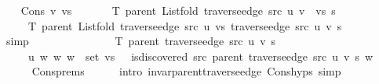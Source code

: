 \begin{isabellebody}
\isanewline
\ \ \isamarkupfalse%
\ {\isacharparenleft}{\kern0pt}Cons\ v\ vs{\isacharparenright}{\kern0pt}\isanewline
\ \ \isamarkupfalse%
\isanewline
\ \ \ \ {\isachardoublequoteopen}T\ {\isacharparenleft}{\kern0pt}parent\ {\isacharparenleft}{\kern0pt}List{\isachardot}{\kern0pt}fold\ {\isacharparenleft}{\kern0pt}traverse{\isacharunderscore}{\kern0pt}edge\ src\ u{\isacharparenright}{\kern0pt}\ {\isacharparenleft}{\kern0pt}v\ {\isacharhash}{\kern0pt}\ vs{\isacharparenright}{\kern0pt}\ s{\isacharparenright}{\kern0pt}{\isacharparenright}{\kern0pt}\ {\isacharequal}{\kern0pt}\isanewline
\ \ \ \ \ T\ {\isacharparenleft}{\kern0pt}parent\ {\isacharparenleft}{\kern0pt}List{\isachardot}{\kern0pt}fold\ {\isacharparenleft}{\kern0pt}traverse{\isacharunderscore}{\kern0pt}edge\ src\ u{\isacharparenright}{\kern0pt}\ vs\ {\isacharparenleft}{\kern0pt}traverse{\isacharunderscore}{\kern0pt}edge\ src\ u\ v\ s{\isacharparenright}{\kern0pt}{\isacharparenright}{\kern0pt}{\isacharparenright}{\kern0pt}{\isachardoublequoteclose}\isanewline
\ \ \ \ \isamarkupfalse%
\ simp\isanewline
\ \ \isamarkupfalse%
\ \isamarkupfalse%
\isanewline
\ \ \ \ {\isachardoublequoteopen}{\isachardot}{\kern0pt}{\isachardot}{\kern0pt}{\isachardot}{\kern0pt}\ {\isacharequal}{\kern0pt}\isanewline
\ \ \ \ \ T\ {\isacharparenleft}{\kern0pt}parent\ {\isacharparenleft}{\kern0pt}traverse{\isacharunderscore}{\kern0pt}edge\ src\ u\ v\ s{\isacharparenright}{\kern0pt}{\isacharparenright}{\kern0pt}\ {\isasymunion}\isanewline
\ \ \ \ \ {\isacharbraceleft}{\kern0pt}{\isacharparenleft}{\kern0pt}u{\isacharcomma}{\kern0pt}\ w{\isacharparenright}{\kern0pt}\ {\isacharbar}{\kern0pt}w{\isachardot}{\kern0pt}\ w\ {\isasymin}\ set\ vs\ {\isasymand}\ {\isasymnot}\ is{\isacharunderscore}{\kern0pt}discovered\ src\ {\isacharparenleft}{\kern0pt}parent\ {\isacharparenleft}{\kern0pt}traverse{\isacharunderscore}{\kern0pt}edge\ src\ u\ v\ s{\isacharparenright}{\kern0pt}{\isacharparenright}{\kern0pt}\ w{\isacharbraceright}{\kern0pt}{\isachardoublequoteclose}\isanewline
\ \ \ \ \isamarkupfalse%
\ Cons{\isachardot}{\kern0pt}prems\isanewline
\ \ \ \ \isamarkupfalse%
\ {\isacharparenleft}{\kern0pt}intro\ invar{\isacharunderscore}{\kern0pt}parent{\isacharunderscore}{\kern0pt}traverse{\isacharunderscore}{\kern0pt}edge\ Cons{\isachardot}{\kern0pt}hyps{\isacharparenright}{\kern0pt}\ simp{\isacharplus}{\kern0pt}\isanewline
\ \ \isamarkupfalse%
\ \isamarkupfalse%
\isanewline
\ \ \ \ {\isachardoublequoteopen}{\isachardot}{\kern0pt}{\isachardot}{\kern0pt}{\isachardot}{\kern0pt}\ {\isacharequal}{\kern0pt}\isanewline

\end{isabellebody}
